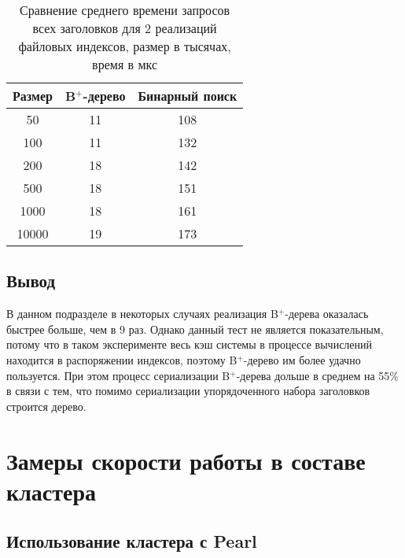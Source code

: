 
\begin{table}[!h]
    \begin{center}
        \begin{tabular}{|c|c|c|}
            \hline
            Размер & B$^+$-дерево & Бинарный поиск \\
            \hline
            50 & 11 & 108\\
            \hline
            100 & 11 & 132\\
            \hline
            200 & 18 & 142\\
            \hline
            500 & 18 & 151\\
            \hline
            1000 & 18 & 161\\
            \hline
            10000 & 19 & 173\\
            \hline
        \end{tabular}
    \end{center}
    \caption{\label{tab:all} Сравнение среднего времени запросов всех заголовков для 2 реализаций файловых индексов, размер в тысячах, время в мкс}
\end{table}

\clearpage


\subsection*{Вывод}

В данном подразделе в некоторых случаях реализация B$^+$-дерева оказалась быстрее больше, чем в 9 раз. Однако данный тест не является показательным, потому что в таком эксперименте весь кэш системы в процессе вычислений находится в распоряжении индексов, поэтому B$^+$-дерево им более удачно пользуется. При этом процесс сериализации B$^+$-дерева дольше в среднем на 55\% в связи с тем, что помимо сериализации упорядоченного набора заголовков строится дерево.

\section{Замеры скорости работы в составе кластера}

\subsection{Использование кластера с Pearl}

